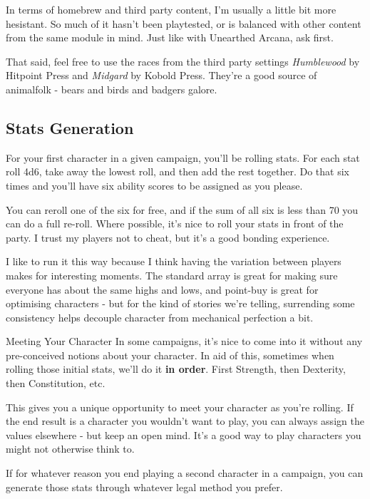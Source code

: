 In terms of homebrew and third party content, I'm usually a little bit more hesistant. So much of it hasn't been playtested, or is balanced with other content from the same module in mind. Just like with Unearthed Arcana, ask first.

That said, feel free to use the races from the third party settings \textit {Humblewood} by Hitpoint Press and \textit{Midgard} by Kobold Press. They're a good source of animalfolk - bears and birds and badgers galore.

\subsection {Stats Generation}

For your first character in a given campaign, you'll be rolling stats. For each stat roll 4d6, take away the lowest roll, and then add the rest together. Do that six times and you'll have six ability scores to be assigned as you please.

You can reroll one of the six for free, and if the sum of all six is less than 70 you can do a full re-roll. Where possible, it's nice to roll your stats in front of the party. I trust my players not to cheat, but it's a good bonding experience.

I like to run it this way because I think having the variation between players makes for interesting moments. The standard array is great for making sure everyone has about the same highs and lows, and point-buy is great for optimising characters - but for the kind of stories we're telling, surrending some consistency helps decouple character from mechanical perfection a bit.

\begin{DndComment}{Meeting Your Character}
In some campaigns, it's nice to come into it without any pre-conceived notions about your character. In aid of this, sometimes when rolling those initial stats, we'll do it \textbf{in order}. First Strength, then Dexterity, then Constitution, etc.

This gives you a unique opportunity to meet your character as you're rolling. If the end result is a character you wouldn't want to play, you can always assign the values elsewhere - but keep an open mind. It's a good way to play characters you might not otherwise think to.
\end{DndComment}

If for whatever reason you end playing a second character in a campaign, you can generate those stats through whatever legal method you prefer.

